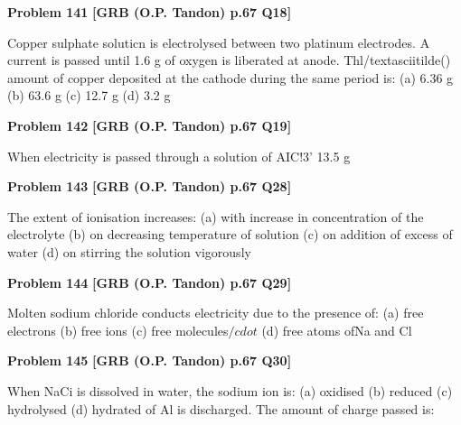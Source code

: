 \begin{problembox}
\textbf{Problem 141} \hfill \textbf{[GRB (O.P. Tandon) p.67 Q18]}
\label{q:ext-grb_all_questions-141}

Copper sulphate soluticn is electrolysed between two 
platinum electrodes. A current is passed until 1.6 g of oxygen 
is liberated at anode. Thl/textasciitilde() amount of copper deposited at the 
cathode during the same period is: 
(a) 6.36 g 
(b) 63.6 g 
(c) 12.7 g 
(d) 3.2 g
\end{problembox}

\begin{problembox}
\textbf{Problem 142} \hfill \textbf{[GRB (O.P. Tandon) p.67 Q19]}
\label{q:ext-grb_all_questions-142}

When electricity is passed through a solution of AIC!3' 13.5 g
\end{problembox}

\begin{problembox}
\textbf{Problem 143} \hfill \textbf{[GRB (O.P. Tandon) p.67 Q28]}
\label{q:ext-grb_all_questions-143}

The extent of ionisation increases: 
(a) with increase in concentration of the electrolyte 
(b) on decreasing temperature of solution 
(c) on addition of excess of water 
(d) on stirring the solution vigorously
\end{problembox}

\begin{problembox}
\textbf{Problem 144} \hfill \textbf{[GRB (O.P. Tandon) p.67 Q29]}
\label{q:ext-grb_all_questions-144}

Molten sodium chloride conducts electricity due to the 
presence of: 
(a) free electrons 
(b) free ions 
(c) free molecules$/cdot$ 
(d) free atoms ofNa and Cl
\end{problembox}

\begin{problembox}
\textbf{Problem 145} \hfill \textbf{[GRB (O.P. Tandon) p.67 Q30]}
\label{q:ext-grb_all_questions-145}

When NaCi is dissolved in water, the sodium ion is: 
(a) oxidised 
(b) reduced 
(c) hydrolysed 
(d) hydrated 
of Al is discharged. The amount of charge passed is:
\end{problembox}

